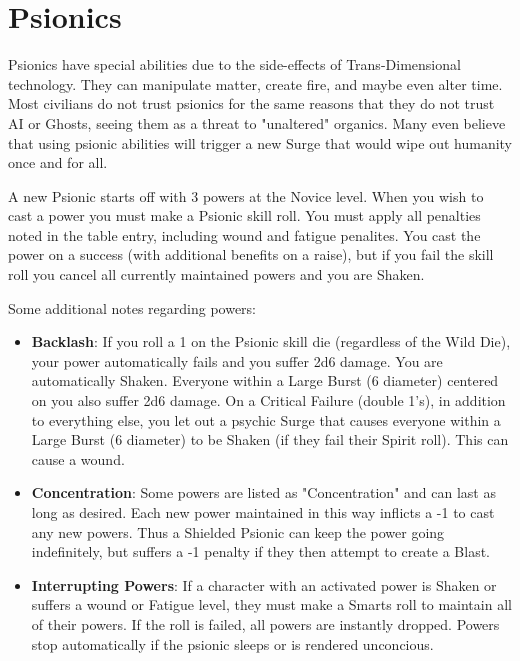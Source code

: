 
\section{Psionics}
\label{sec:psionics}

\begin{multicols}{2}

Psionics have special abilities due to the side-effects of Trans-Dimensional technology. They can manipulate matter, create fire, and maybe even alter time. Most civilians do not trust psionics for the same reasons that they do not trust AI or Ghosts, seeing them as a threat to "unaltered" organics. Many even believe that using psionic abilities will trigger a new Surge that would wipe out humanity once and for all.

A new Psionic starts off with 3 powers at the Novice level. When you wish to cast a power you must make a Psionic skill roll. You must apply all penalties noted in the table entry, including wound and fatigue penalites. You cast the power on a success (with additional benefits on a raise), but if you fail the skill roll you cancel all currently maintained powers and you are Shaken.

Some additional notes regarding powers:

\begin{itemize}

  \item \textbf{Backlash}: If you roll a 1 on the Psionic skill die (regardless of the Wild Die), your power automatically fails and you suffer 2d6 damage. You are automatically Shaken. Everyone within a Large Burst (6 diameter) centered on you also suffer 2d6 damage. On a Critical Failure (double 1's), in addition to everything else, you let out a psychic Surge that causes everyone within a Large Burst (6 diameter) to be Shaken (if they fail their Spirit roll). This can cause a wound.

  \item \textbf{Concentration}: Some powers are listed as "Concentration" and can last as long as desired. Each new power maintained in this way inflicts a -1 to cast any new powers. Thus a Shielded Psionic can keep the power going indefinitely, but suffers a -1 penalty if they then attempt to create a Blast.

  \item \textbf{Interrupting Powers}: If a character with an activated power is Shaken or suffers a wound or Fatigue level, they must make a Smarts roll to maintain all of their powers. If the roll is failed, all powers are instantly dropped. Powers stop automatically if the psionic sleeps or is rendered unconcious.


\end{itemize}
\end{multicols}

